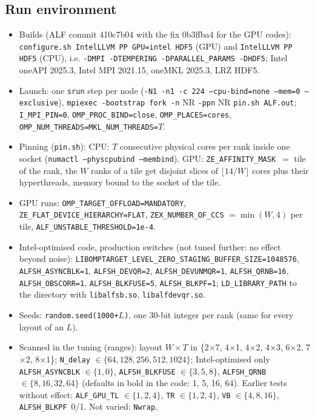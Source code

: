\documentclass[11pt,a4paper]{article}
\begin{document}
\subsection*{Run environment}
\begin{itemize}\itemsep0pt
\item Builds (ALF commit 410c7b04 with the fix 0b3ffba4 for the GPU codes): \texttt{configure.sh IntelLLVM PP GPU=intel HDF5} (GPU) and \texttt{IntelLLVM PP HDF5} (CPU), i.e. \texttt{-DMPI -DTEMPERING -DPARALLEL\_PARAMS -DHDF5}; Intel oneAPI 2025.3, Intel MPI 2021.15, oneMKL 2025.3, LRZ HDF5.
\item Launch: one \texttt{srun} step per node (\texttt{-N1 -n1 -c 224 --cpu-bind=none --mem=0 --exclusive}), \texttt{mpiexec -bootstrap fork -n} NR \texttt{-ppn} NR \texttt{pin.sh ALF.out}; \texttt{I\_MPI\_PIN=0}, \texttt{OMP\_PROC\_BIND=close}, \texttt{OMP\_PLACES=cores}, \texttt{OMP\_NUM\_THREADS=MKL\_NUM\_THREADS=}$T$.
\item Pinning (\texttt{pin.sh}): CPU: $T$ consecutive physical cores per rank inside one socket (\texttt{numactl --physcpubind --membind}). GPU: \texttt{ZE\_AFFINITY\_MASK}~$=$ tile of the rank, the $W$ ranks of a tile get disjoint slices of $\lfloor14/W\rfloor$ cores plus their hyperthreads, memory bound to the socket of the tile.
\item GPU runs: \texttt{OMP\_TARGET\_OFFLOAD=MANDATORY}, \texttt{ZE\_FLAT\_DEVICE\_HIERARCHY=FLAT}, \texttt{ZEX\_NUMBER\_OF\_CCS} $=\min(W,4)$ per tile, \texttt{ALF\_UNSTABLE\_THRESHOLD=1e-4}.
\item Intel-optimised code, production switches (not tuned further: no effect beyond noise): \texttt{LIBOMPTARGET\_LEVEL\_ZERO\_STAGING\_BUFFER\_SIZE=1048576}, \texttt{ALFSH\_ASYNCBLK=1}, \texttt{ALFSH\_DEVQR=2}, \texttt{ALFSH\_DEVUNMQR=1}, \texttt{ALFSH\_QRNB=16}, \texttt{ALFSH\_OBSCORR=1}, \texttt{ALFSH\_BLKFUSE=5}, \texttt{ALFSH\_BLKPF=1}; \texttt{LD\_LIBRARY\_PATH} to the directory with \texttt{libalfsb.so}, \texttt{libalfdevqr.so}.
\item Seeds: \texttt{random.seed(1000+$L$)}, one 30-bit integer per rank (same for every layout of an $L$).
\item Scanned in the tuning (ranges): layout $W\times T$ in \{2$\times$7, 4$\times$1, 4$\times$2, 4$\times$3, 6$\times$2, 7$\times$2, 8$\times$1\}; \texttt{N\_delay} $\in\{64,128,256,512,1024\}$; Intel-optimised only \texttt{ALFSH\_ASYNCBLK} $\in\{1,0\}$, \texttt{ALFSH\_BLKFUSE} $\in\{3,5,8\}$, \texttt{ALFSH\_QRNB} $\in\{8,16,32,64\}$ (defaults in bold in the code: 1, 5, 16, 64). Earlier tests without effect: \texttt{ALF\_GPU\_TL} $\in\{1,2,4\}$, \texttt{TR} $\in\{1,2,4\}$, \texttt{VB} $\in\{4,8,16\}$, \texttt{ALFSH\_BLKPF}~0/1. Not varied: \texttt{Nwrap}.
\end{itemize}
\end{document}
